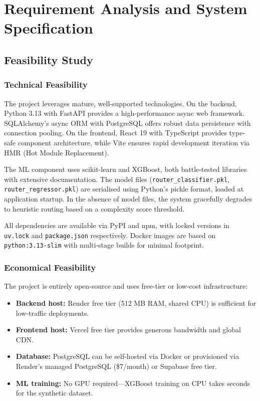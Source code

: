 \documentclass[12pt,a4paper]{report}
\begin{document}
\chapter{Requirement Analysis and System Specification}

\section{Feasibility Study}

\subsection{Technical Feasibility}

The project leverages mature, well-supported technologies. On the backend, Python 3.13 with FastAPI provides a high-performance async web framework. SQLAlchemy's async ORM with PostgreSQL offers robust data persistence with connection pooling. On the frontend, React 19 with TypeScript provides type-safe component architecture, while Vite ensures rapid development iteration via HMR (Hot Module Replacement).

The ML component uses scikit-learn and XGBoost, both battle-tested libraries with extensive documentation. The model files (\texttt{router\_classifier.pkl}, \texttt{router\_regressor.pkl}) are serialised using Python's pickle format, loaded at application startup. In the absence of model files, the system gracefully degrades to heuristic routing based on a complexity score threshold.

All dependencies are available via PyPI and npm, with locked versions in \texttt{uv.lock} and \texttt{package.json} respectively. Docker images are based on \texttt{python:3.13-slim} with multi-stage builds for minimal footprint.

\subsection{Economical Feasibility}

The project is entirely open-source and uses free-tier or low-cost infrastructure:
\begin{itemize}[nosep]
    \item \textbf{Backend host:} Render free tier (512 MB RAM, shared CPU) is sufficient for low-traffic deployments.
    \item \textbf{Frontend host:} Vercel free tier provides generous bandwidth and global CDN.
    \item \textbf{Database:} PostgreSQL can be self-hosted via Docker or provisioned via Render's managed PostgreSQL (\$7/month) or Supabase free tier.
    \item \textbf{ML training:} No GPU required---XGBoost training on CPU takes seconds for the synthetic dataset.
\end{itemize}
\end{document}

